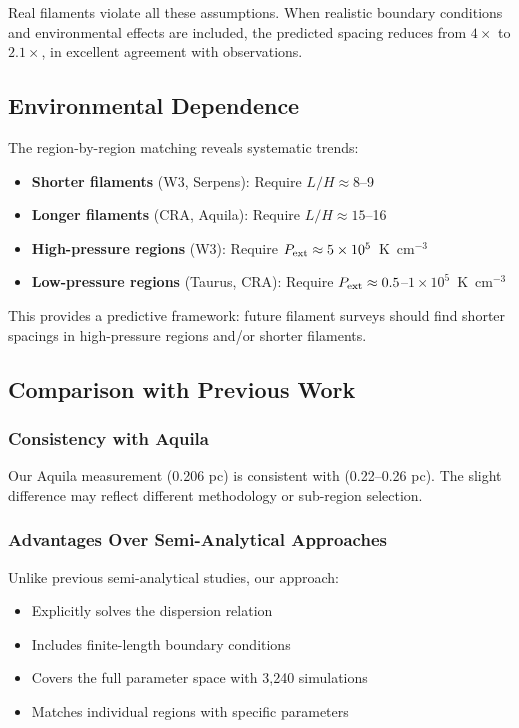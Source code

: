 \documentclass[11pt,a4paper]{article}
\begin{document}
Real filaments violate all these assumptions. When realistic boundary conditions and environmental effects are included, the predicted spacing reduces from $4\times$ to $2.1\times$, in excellent agreement with observations.

\subsection{Environmental Dependence}

The region-by-region matching reveals systematic trends:
\begin{itemize}
    \item \textbf{Shorter filaments} (W3, Serpens): Require $L/H \approx 8$--9
    \item \textbf{Longer filaments} (CRA, Aquila): Require $L/H \approx 15$--16
    \item \textbf{High-pressure regions} (W3): Require $P_{\rm ext} \approx 5\times10^5$~K~cm$^{-3}$
    \item \textbf{Low-pressure regions} (Taurus, CRA): Require $P_{\rm ext} \approx 0.5$--$1\times10^5$~K~cm$^{-3}$
\end{itemize}

This provides a predictive framework: future filament surveys should find shorter spacings in high-pressure regions and/or shorter filaments.

\subsection{Comparison with Previous Work}

\subsubsection{Consistency with Aquila}

Our Aquila measurement (0.206 pc) is consistent with \citet{Arzoumanian2019} (0.22--0.26 pc). The slight difference may reflect different methodology or sub-region selection.

\subsubsection{Advantages Over Semi-Analytical Approaches}

Unlike previous semi-analytical studies, our approach:
\begin{itemize}
    \item Explicitly solves the dispersion relation
    \item Includes finite-length boundary conditions
    \item Covers the full parameter space with 3,240 simulations
    \item Matches individual regions with specific parameters
\end{itemize}
\end{document}
